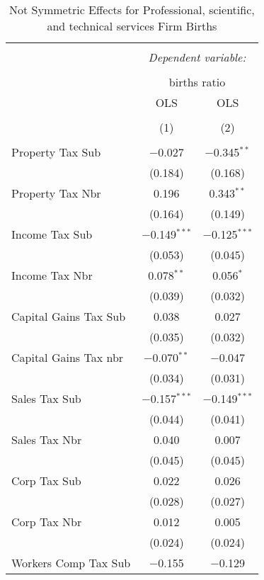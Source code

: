 
\begin{table}[!htbp] \centering 
  \caption{Not Symmetric Effects for  Professional, scientific, and technical services Firm Births} 
  \label{54noequality} 
\footnotesize 
\begin{tabular}{@{\extracolsep{5pt}}lcc} 
\\[-1.8ex]\hline 
\hline \\[-1.8ex] 
 & \multicolumn{2}{c}{\textit{Dependent variable:}} \\ 
\cline{2-3} 
\\[-1.8ex] & \multicolumn{2}{c}{births ratio} \\ 
 & OLS & OLS \\ 
\\[-1.8ex] & (1) & (2)\\ 
\hline \\[-1.8ex] 
 Property Tax Sub & $-$0.027 & $-$0.345$^{**}$ \\ 
  & (0.184) & (0.168) \\ 
  Property Tax Nbr & 0.196 & 0.343$^{**}$ \\ 
  & (0.164) & (0.149) \\ 
  Income Tax Sub & $-$0.149$^{***}$ & $-$0.125$^{***}$ \\ 
  & (0.053) & (0.045) \\ 
  Income Tax Nbr & 0.078$^{**}$ & 0.056$^{*}$ \\ 
  & (0.039) & (0.032) \\ 
  Capital Gains Tax Sub & 0.038 & 0.027 \\ 
  & (0.035) & (0.032) \\ 
  Capital Gains Tax nbr & $-$0.070$^{**}$ & $-$0.047 \\ 
  & (0.034) & (0.031) \\ 
  Sales Tax Sub & $-$0.157$^{***}$ & $-$0.149$^{***}$ \\ 
  & (0.044) & (0.041) \\ 
  Sales Tax Nbr & 0.040 & 0.007 \\ 
  & (0.045) & (0.045) \\ 
  Corp Tax Sub & 0.022 & 0.026 \\ 
  & (0.028) & (0.027) \\ 
  Corp Tax Nbr & 0.012 & 0.005 \\ 
  & (0.024) & (0.024) \\ 
  Workers Comp Tax Sub & $-$0.155 & $-$0.129 \\ 

\end{tabular}
\end{table}
